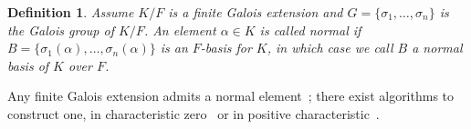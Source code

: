 \documentclass[12pt]{article}
\theoremstyle{plain}
\newtheorem{lemma}[theorem]{Lemma}
\newtheorem{definition}[theorem]{Definition}
\newcommand{\Z}{\ensuremath{\mathbb{Z}}}
\begin{document}


\begin{definition}
  Assume $K/F$ is a finite Galois extension and $G = \lbrace \sigma_1,
  \ldots , \sigma_n \rbrace$ is the Galois group of $K/F$. An element
  $\alpha \in K$ is called normal if $B = \lbrace \sigma_1(\alpha),
  \ldots , \sigma_n(\alpha) \rbrace$ is an $F$-basis for $K$, in which
  case we call $B$ a normal basis of $K$ over $F$.
\end{definition} 

Any finite Galois extension admits a normal element~\cite[Theorem
  6.13.1]{Lang}; there exist algorithms to construct one, in
characteristic zero~\cite{Girstmair} or in positive
characteristic~\cite{Giesbrecht,Poli}.


\end{document}
